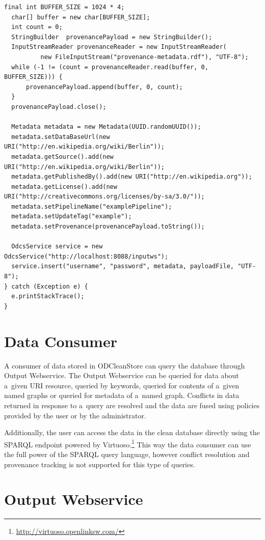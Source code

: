 {\begin{lstlisting}[caption={Example usage of Input Webservice client library},label=lst:clientLibrary]
  final int BUFFER_SIZE = 1024 * 4;
  char[] buffer = new char[BUFFER_SIZE];
  int count = 0;
  StringBuilder  provenancePayload = new StringBuilder();
  InputStreamReader provenanceReader = new InputStreamReader(
          new FileInputStream("provenance-metadata.rdf"), "UTF-8");
  while (-1 != (count = provenanceReader.read(buffer, 0, BUFFER_SIZE))) {
      provenancePayload.append(buffer, 0, count);
  }
  provenancePayload.close();

  Metadata metadata = new Metadata(UUID.randomUUID());
  metadata.setDataBaseUrl(new URI("http://en.wikipedia.org/wiki/Berlin"));
  metadata.getSource().add(new URI("http://en.wikipedia.org/wiki/Berlin"));
  metadata.getPublishedBy().add(new URI("http://en.wikipedia.org"));
  metadata.getLicense().add(new URI("http://creativecommons.org/licenses/by-sa/3.0/")); 
  metadata.setPipelineName("examplePipeline");
  metadata.setUpdateTag("example"); 
  metadata.setProvenance(provenancePayload.toString()); 

  OdcsService service = new OdcsService("http://localhost:8088/inputws");
  service.insert("username", "password", metadata, payloadFile, "UTF-8");
} catch (Exception e) {
  e.printStackTrace();
}
\end{lstlisting}

\section{Data Consumer}
\label{sec:outputWS}

A consumer of data stored in ODCleanStore can query the database through Output Webservice. The Output Webservice can be queried for data about a~given URI resource, queried by keywords, queried for contents of a~given named graphs or queried for metadata of a~named graph. Conflicts in data returned in response to a~query are resolved and the data are fused using policies provided by the user or by the administrator.

Additionally, the user can access the data in the clean database directly using the SPARQL endpoint powered by Virtuoso.\footnote{\url{http://virtuoso.openlinksw.com/}} This way the data consumer can use the full power of the SPARQL query language, however conflict resolution and provenance tracking is not supported for this type of queries.


\section*{Output Webservice}

}
